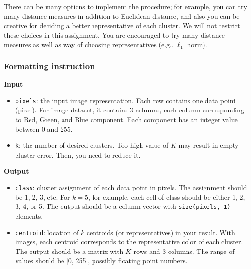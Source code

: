 \documentclass[twoside,10pt]{article}
\begin{document}
There can be many options to implement the procedure; for example, you can try many distance measures in addition to Euclidean distance, and also you can be creative for deciding a better representative of each cluster. We will not restrict these choices in this assignment. You are encouraged to try many distance measures as well as way of choosing representatives (e.g., $\ell_1$ norm).

\subsubsection*{Formatting instruction}


\textbf{Input}
\begin{itemize}
  \item \texttt{pixels}: the input image representation. Each row contains one data point (pixel). For image dataset, it contains 3 columns, each column corresponding to Red, Green, and Blue component. Each component has an integer value between 0 and 255.
  \item \texttt{k}: the number of desired clusters. Too high value of $K$ may result in empty cluster error. Then, you need to reduce it.
\end{itemize}

\textbf{Output}
\begin{itemize}
  \item \texttt{class}: cluster assignment of each data point in pixels. The assignment should be 1, 2, 3, etc. For $k = 5$, for example, each cell of class should be either 1, 2, 3, 4, or 5. The output should be a column vector with \texttt{size(pixels, 1)} elements.
  \item \texttt{centroid}: location of $k$ centroids (or representatives) in your result. With images, each centroid corresponds to the representative color of each cluster. The output should be a matrix with $K$ rows and 3 columns. The range of values should be [0, 255], possibly floating point numbers.
\end{itemize}
\end{document}
